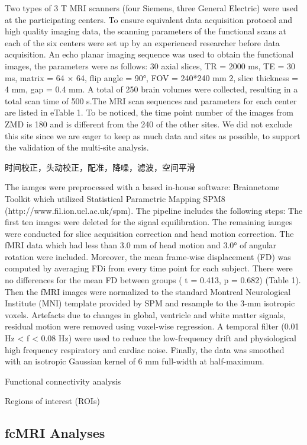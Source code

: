 \documentclass[preprint,authoryear,review,12pt]{elsarticle}
\begin{document}
 
Two types of 3 T MRI scanners (four Siemens, three General Electric) were used at the participating centers. To ensure equivalent data acquisition protocol and high quality imaging data, the scanning parameters of the functional scans at each of the six centers were set up by an experienced researcher before data acquisition. An echo planar imaging sequence was used to obtain the
functional images, the parameters were as follows: 30 axial slices, TR = 2000 ms, TE = 30 ms, matrix = 64 × 64, flip angle = 90°, FOV = 240*240 mm 2, slice thickness = 4 mm, gap = 0.4 mm. A total of 250 brain volumes were collected, resulting in a total scan time of 500 s.The MRI scan sequences and parameters for each center are listed in eTable 1. To be noticed, the time point number of the images from ZMD is 180 and is different from the 240 of the other sites. We did not exclude this site since we are eager to keep as much data and sites as possible, to support the validation of the multi-site analysis.   

时间校正，头动校正，配准，降噪，滤波，空间平滑

The iamges were preprocessed with a based in-house software: Brainnetome Toolkit which utilized Statistical Parametric Mapping SPM8 (http://www.fil.ion.ucl.ac.uk/spm). The pipeline includes the following steps: The first ten images were deleted for the signal equilibration. The remaining iamges were conducted for slice acquisition correction and head motion correction.  The fMRI data which had
less than 3.0 mm of head motion and 3.0° of angular rotation were included.  Moreover, the mean frame-wise displacement (FD) was computed by averaging FDi from every time point for each subject. There were no differences for the mean FD between groups
( t = 0.413, p = 0.682) (Table 1). Then the fMRI images were normalized to the standard Montreal Neurological Institute (MNI) template provided by SPM and resample to the 3-mm isotropic voxels. Artefacts due to changes in global, ventricle and white matter signals, residual motion were removed using voxel-wise regression. A temporal filter (0.01 Hz < f < 0.08 Hz) were used to reduce the low-frequency drift and physiological high frequency respiratory and cardiac noise.  Finally, the data was smoothed with an isotropic Gaussian kernel of 6 mm full-width at half-maximum. 

Functional connectivity analysis

Regions of interest (ROIs)

\subsection*{fcMRI Analyses}
\end{document}
